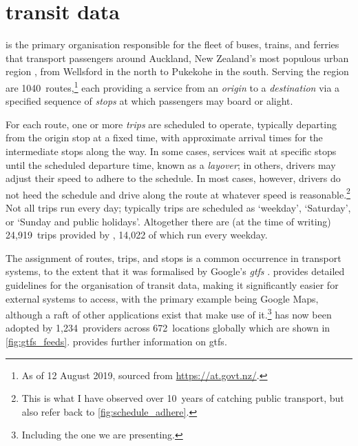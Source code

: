 \chapter{\Rt{} transit data}
\label{cha:data}



\AT{} is the primary organisation responsible for the fleet of buses, trains, and ferries that transport passengers around Auckland, New Zealand's most populous urban region \citep{StatsNZ_2019}, from Wellsford in the north to Pukekohe in the south. Serving the region are 1040~routes,\footnote{As of 12 August 2019, sourced from \url{https://at.govt.nz/}.} each providing a service from an \emph{origin} to a \emph{destination} via a specified sequence of \emph{stops} at which passengers may board or alight.


For each route, one or more \emph{trips} are scheduled to operate, typically departing from the origin stop at a fixed time, with approximate arrival times for the intermediate stops along the way. In some cases, services wait at specific stops until the scheduled departure time, known as a \emph{layover}; in others, drivers may adjust their speed to adhere to the schedule. In most cases, however, drivers do not heed the schedule and drive along the route at whatever speed is reasonable.\footnote{This is what I have observed over 10~years of catching public transport, but also refer back to \cref{fig:schedule_adhere}.} Not all trips run every day; typically trips are scheduled as `weekday', `Saturday', or `Sunday and public holidays'. Altogether there are (at the time of writing) 24,919~trips provided by \AT{}, 14,022 of which run every weekday.


The assignment of routes, trips, and stops is a common occurrence in transport systems, to the extent that it was formalised by Google's \emph{\acrfull{gtfs}} \citep {GoogleDevelopers_2006}. \GTFS{} provides detailed guidelines for the organisation of transit data, making it significantly easier for external systems to access, with the primary example being Google Maps, although a raft of other applications exist that make use of it.\footnote{Including the one we are presenting.} \GTFS{} has now been adopted by 1,234~providers across 672~locations globally which are shown in \cref{fig:gtfs_feeds}.  provides further information on \gls{gtfs}.

